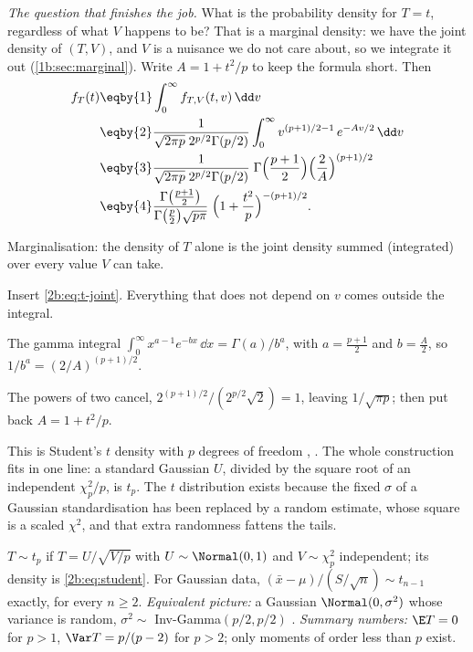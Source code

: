 \emph{The question that finishes the job.} What is the probability density for $T=t$,
regardless of what $V$ happens to be? That is a marginal density: we have the joint
density of $(T,V)$, and $V$ is a nuisance we do not care about, so we integrate it out
(\cref{1b:sec:marginal}). Write $A=1+t^2/p$ to keep the formula short. Then
\begin{align}
  f_T(t)
  &\eqby{1} \int_0^\infty f_{T,V}(t,v)\,\dd v \nonumber\\
  &\eqby{2} \frac{1}{\sqrt{2\pi p}\;2^{p/2}\Gamma(p/2)}
            \int_0^\infty v^{(p+1)/2-1}\,e^{-Av/2}\,\dd v \nonumber\\
  &\eqby{3} \frac{1}{\sqrt{2\pi p}\;2^{p/2}\Gamma(p/2)}\;
            \Gamma\Bigl(\frac{p+1}{2}\Bigr)\Bigl(\frac{2}{A}\Bigr)^{(p+1)/2} \nonumber\\
  &\eqby{4} \frac{\Gamma\bigl(\frac{p+1}{2}\bigr)}{\Gamma\bigl(\frac p2\bigr)\sqrt{p\pi}}\;
            \Bigl(1+\frac{t^2}{p}\Bigr)^{-(p+1)/2} .
  \label{2b:eq:student}
\end{align}
\begin{explain}
  \item Marginalisation: the density of $T$ alone is the joint density summed (integrated) over every value $V$ can take.
  \item Insert \eqref{2b:eq:t-joint}. Everything that does not depend on $v$ comes outside the integral.
  \item The gamma integral $\int_0^\infty x^{a-1}e^{-bx}\,\dd x=\Gamma(a)/b^a$, with $a=\frac{p+1}{2}$ and $b=\frac A2$, so $1/b^a=(2/A)^{(p+1)/2}$.
  \item The powers of two cancel, $2^{(p+1)/2}/(2^{p/2}\sqrt2)=1$, leaving $1/\sqrt{\pi p}$; then put back $A=1+t^2/p$.
\end{explain}
This is Student's $t$ density with $p$ degrees of freedom , .
The whole construction fits in one line: a standard Gaussian $U$, divided by the
square root of an independent $\chi^2_p/p$, is $t_p$. The $t$ distribution exists because
the fixed $\sigma$ of a Gaussian standardisation has been replaced by a random estimate,
whose square is a scaled $\chi^2$, and that extra randomness fattens the tails.

\begin{workdef}
$T\sim t_p$ if $T=U/\sqrt{V/p}$ with $U\sim\Normal(0,1)$ and $V\sim\chi^2_p$ independent; its density is \eqref{2b:eq:student}. For Gaussian data, $(\bar x-\mu)/(S/\sqrt n)\sim t_{n-1}$ exactly, for every $n\ge2$.
\emph{Equivalent picture:} a Gaussian $\Normal(0,\sigma^2)$ whose variance is random, $\sigma^2\sim$ Inv-Gamma$(p/2,p/2)$  .
\emph{Summary numbers:} $\E T=0$ for $p>1$, $\Var T=p/(p-2)$ for $p>2$; only moments of order less than $p$ exist.
\end{workdef}


